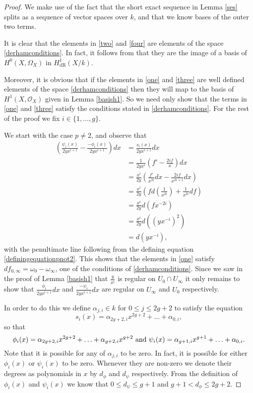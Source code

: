 \documentclass[draft, 11pt]{article} %
\theoremstyle{plain}
\theoremstyle{remark}
\newcommand{\hone}{H^1(X,\mathcal{O}_X)}
\newcommand{\derhamhone}{H_{\text {dR}}^1(X/k)}
\begin{document}
\begin{proof}
We make use of the fact that the short exact sequence in Lemma \ref{ses} splits as a sequence of vector spaces over $k$, and that we know bases of the outer two terms.

It is clear that the elements in \eqref{two} and \eqref{four} are elements of the space \eqref{derhamconditions}. 
In fact, it follows from \cite[Thm 6.1]{faithfulaction} that they are the image of a basis of $H^0(X,\Omega_X)$ in $\derhamhone$.

Moreover, it is obvious that if the elements in \eqref{one} and \eqref{three} are well defined elements of the space \eqref{derhamconditions} then they will map to the basis of $\hone$ given in Lemma \ref{basish1}.
So we need only show that the terms in \eqref{one} and \eqref{three} satisfy the conditions stated in \eqref{derhamconditions}.
For the rest of the proof we fix $i \in \{1, \ldots ,g\}$.


We start with the case $p\neq 2$, and observe that
\begin{align*}
\left(  \frac{\psi_i(x)}{2yx^{i+1}}  - \frac{-\phi_i(x)}{2yx^{i+1}} \right) dx & =  \frac{s_i(x)}{2yx^{i+1}} dx \\
& =  \frac{1}{2yx^i} \left( f' - \frac{2if}{x} \right) dx \\
& =  \frac{x^i}{2y} \left( \frac{f'}{x^{2i}}dx -\frac{2if}{x^{2i+1}} dx \right) \\
& =  \frac{x^i}{2y} \left( fd\left(\frac{1}{x^{2i}}\right) + \frac{1}{x^{2i}}df \right) \\
& =  \frac{x^i}{2y}d(fx^{-2i}) \\
& =  \frac{x^i}{2y} d\left(\left(yx^{-i}\right)^2\right) \\
& =  d(yx^{-i}),
\end{align*}
with the penultimate line following from the defining equation \eqref{definingequationpnot2}.
This shows that the elements in \eqref{one} satisfy $df_{0, \infty} = \omega_0 - \omega_\infty$, one of the conditions of \eqref{derhamconditions}.
Since we saw in the proof of Lemma \ref{basish1} that $\frac{y}{x^i}$ is regular on $U_0\cap U_\infty$ it only remains to show that $\frac{\phi_i}{2yx^{i+1}}dx$ and $\frac{-\psi_i}{2yx^{i+1}}dx$ are regular on $U_\infty$ and $U_0$ respectively.


In order to do this we define $\alpha_{j,i} \in k$ for $0\leq j \leq 2g+2$ to satisfy the equation
\[
s_i(x) = \alpha_{2g+2,i}x^{2g+2} + \ldots + \alpha_{0,i},
\]
so that
\[
\phi_i(x) = \alpha_{2g+2,i}x^{2g+2} + \ldots + \alpha_{g+2,i}x^{g+2} \ {\rm and } \ \psi_i(x) = \alpha_{g+1,i}x^{g+1} + \ldots + \alpha_{0,i}.
\]
Note that it is possible for any of $\alpha_{j,i}$ to be zero. In fact, it is possible for either $\phi_i(x)$ or $\psi_i(x)$ to be zero.
Whenever they are non-zero we denote their degrees as polynomials in $x$ by $d_\phi$ and $d_\psi$ respectively. From the definition of $\phi_i(x)$ and $\psi_i(x)$ we know that $0 \leq d_\psi \leq g+1$ and $g+1 < d_\phi \leq 2g+2$.



\end{proof}
\end{document}
